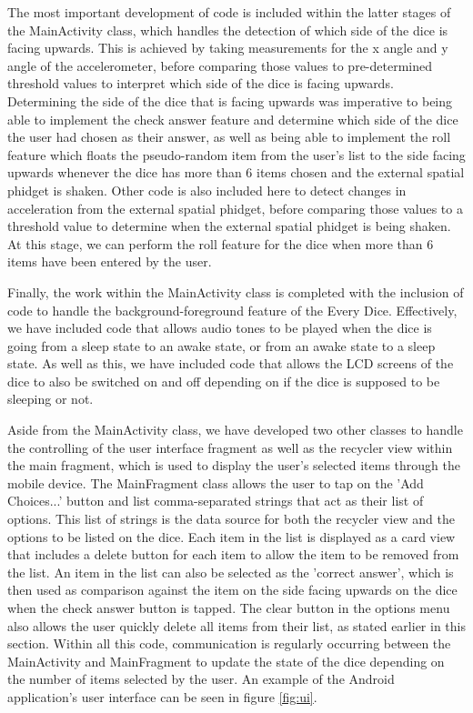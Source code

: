 \documentclass{sigchi}
\begin{document}
  The most important development of code is included within the latter stages of the MainActivity class, which handles the detection of which side of the dice is facing upwards. This is achieved by taking measurements for the x angle and y angle of the accelerometer, before comparing those values to pre-determined threshold values to interpret which side of the dice is facing upwards. Determining the side of the dice that is facing upwards was imperative to being able to implement the check answer feature and determine which side of the dice the user had chosen as their answer, as well as being able to implement the roll feature which floats the pseudo-random item from the user's list to the side facing upwards whenever the dice has more than 6 items chosen and the external spatial phidget is shaken. Other code is also included here to detect changes in acceleration from the external spatial phidget, before comparing those values to a threshold value to determine when the external spatial phidget is being shaken. At this stage, we can perform the roll feature for the dice when more than 6 items have been entered by the user. 

  Finally, the work within the MainActivity class is completed with the inclusion of code to handle the background-foreground feature of the Every Dice. Effectively, we have included code that allows audio tones to be played when the dice is going from a sleep state to an awake state, or from an awake state to a sleep state. As well as this, we have included code that allows the LCD screens of the dice to also be switched on and off depending on if the dice is supposed to be sleeping or not.

  Aside from the MainActivity class, we have developed two other classes to handle the controlling of the user interface fragment as well as the recycler view within the main fragment, which is used to display the user's selected items through the mobile device. The MainFragment class allows the user to tap on the 'Add Choices...' button and list comma-separated strings that act as their list of options. This list of strings is the data source for both the recycler view and the options to be listed on the dice. Each item in the list is displayed as a card view that includes a delete button for each item to allow the item to be removed from the list. An item in the list can also be selected as the 'correct answer', which is then used as comparison against the item on the side facing upwards on the dice when the check answer button is tapped. The clear button in the options menu also allows the user quickly delete all items from their list, as stated earlier in this section. Within all this code, communication is regularly occurring between the MainActivity and MainFragment to update the state of the dice depending on the number of items selected by the user. An example of the Android application's user interface can be seen in figure \ref{fig:ui}.
\end{document}
